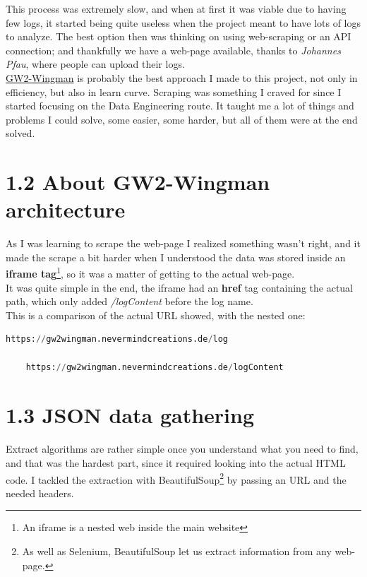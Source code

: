 \documentclass[12pt,a4paper]{article}
\begin{document}
    This process was extremely slow, and when at first it was viable due to having few logs,
    it started being quite useless when the project meant to have lots of logs to analyze.
    The best option then was thinking on using web-scraping or an API connection; and thankfully
    we have a web-page available, thanks to \textit{Johannes Pfau}, where people can upload their logs.\\

    \noindent \href{https://gw2wingman.nevermindcreations.de/home}{GW2-Wingman} is probably the best approach I made to this project, not only in efficiency, but also
    in learn curve. Scraping was something I craved for since I started focusing on the Data Engineering
    route. It taught me a lot of things and problems I could solve, some easier, some harder, but
    all of them were at the end solved.

    \newpage

    \section*{\large 1.2 About GW2-Wingman architecture}
    As I was learning to scrape the web-page I realized something wasn't right, and it made the scrape a
    bit harder when I understood the data was stored inside an \textbf{iframe tag}\footnote{An iframe is a nested web
    inside the main website}, so it was a matter of getting to the actual web-page.\\

    \noindent It was quite simple in the end, the iframe had an \textbf{href} tag containing the actual path, which only added
    \textit{/logContent} before the log name. \\

    \noindent This is a comparison of the actual URL showed, with the nested one:
    \begin{lstlisting}[language=Python]
    https://gw2wingman.nevermindcreations.de/log

    https://gw2wingman.nevermindcreations.de/logContent
    \end{lstlisting}

    \section*{\large 1.3 JSON data gathering}
    Extract algorithms are rather simple once you understand what you need to find, and that was
    the hardest part, since it required looking into the actual HTML code. I tackled the extraction
    with BeautifulSoup\footnote{As well as Selenium, BeautifulSoup let us extract information from any web-page.} 
    by passing an URL and the needed headers.\\
\end{document}
